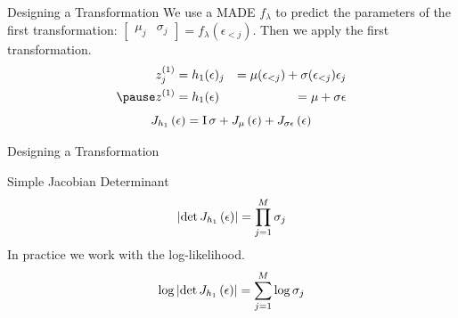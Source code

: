 \documentclass[14pt]{beamer}
\begin{document}
\begin{frame}{Designing a Transformation}
We use a MADE $ f_{\lambda} $ to predict the parameters of the first transformation: $ \begin{bmatrix} \mu_{j} & \sigma_{j} \end{bmatrix} =  f_{\lambda}(\epsilon_{<j}) $.
Then we apply the first transformation.
\begin{equation*}
\begin{aligned}
z^{(1)}_{j} &= h_{1}(\epsilon)_{j} &= \mu(\epsilon_{<j}) + \sigma(\epsilon_{<j}) \epsilon_{j} \\ \pause
z^{(1)} &= h_{1}(\epsilon) &= \mu + \sigma \epsilon
\end{aligned}
\end{equation*}
\pause
\begin{equation*}
J_{h_{1}}\left(\epsilon\right) = \operatorname{I} \sigma + J_{\mu}\left(\epsilon\right) +J_{\sigma \epsilon}\left(\epsilon\right)
\end{equation*}
\end{frame}

\begin{frame}{Designing a Transformation}
\begin{block}{Simple Jacobian Determinant}
\begin{equation*}
\left|\det J_{h_{1}}\left(\epsilon\right)\right| = \prod_{j=1}^{M}\sigma_{j}
\end{equation*}
In practice we work with the log-likelihood.
\begin{equation*}
\log\left|\det J_{h_{1}}\left(\epsilon\right)\right| = \sum_{j=1}^{M}\log\sigma_{j}
\end{equation*}
\end{block}
\end{frame}
\end{document}

